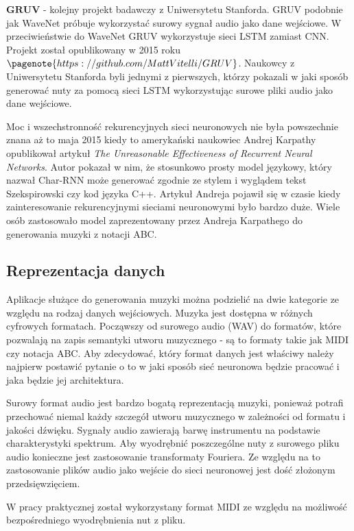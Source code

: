  $\textbf{GRUV}$ - kolejny projekt badawczy z Uniwersytetu Stanforda. GRUV podobnie jak WaveNet próbuje wykorzystać surowy sygnał audio jako dane wejściowe. W przeciwieństwie do WaveNet GRUV wykorzystuje sieci LSTM zamiast CNN. Projekt został opublikowany w 2015 roku$\pagenote{https://github.com/MattVitelli/GRUV}$. Naukowcy z Uniwersytetu Stanforda byli jednymi z pierwszych, którzy pokazali w jaki sposób generować nuty za pomocą sieci LSTM wykorzystując surowe pliki audio jako dane wejściowe. 
 
 
 Moc i wszechstronność rekurencyjnych sieci neuronowych nie była powszechnie znana aż to maja 2015 kiedy to amerykański naukowiec Andrej Karpathy opublikował artykuł \textit{The Unreasonable Effectiveness of Recurrent Neural Networks}. Autor pokazał w nim, że stosunkowo prosty model językowy, który nazwał Char-RNN może generować zgodnie ze stylem i wyglądem tekst Szekspirowski czy kod języka C++. Artykuł Andreja pojawił się w czasie kiedy zainteresowanie rekurencyjnymi sieciami neuronowymi było bardzo duże. Wiele osób zastosowało model zaprezentowany przez Andreja Karpathego do generowania muzyki z notacji ABC. 
 
 
 
 \subsection{Reprezentacja danych}
 
 Aplikacje służące do generowania muzyki można podzielić na dwie kategorie ze względu na rodzaj danych wejściowych. Muzyka jest dostępna w różnych cyfrowych formatach. Począwszy od surowego audio (WAV) do formatów, które pozwalają na zapis semantyki utworu muzycznego - są to formaty takie jak MIDI czy notacja ABC. Aby zdecydować, który format danych jest właściwy należy najpierw postawić pytanie o to w jaki sposób sieć neuronowa będzie pracować i jaka będzie jej architektura. 
 
 Surowy format audio jest bardzo bogatą reprezentacją muzyki, ponieważ potrafi przechować niemal każdy szczegół utworu muzycznego w zależności od formatu i jakości dźwięku. Sygnały audio zawierają barwę instrumentu na podstawie charakterystyki spektrum. Aby wyodrębnić poszczególne nuty z surowego pliku audio konieczne jest zastosowanie transformaty Fouriera. Ze względu na to zastosowanie plików audio jako wejście do sieci neuronowej jest dość złożonym przedsięwzięciem. 
 
 W pracy praktycznej został wykorzystany format MIDI ze względu na możliwość bezpośredniego wyodrębnienia nut z pliku.

